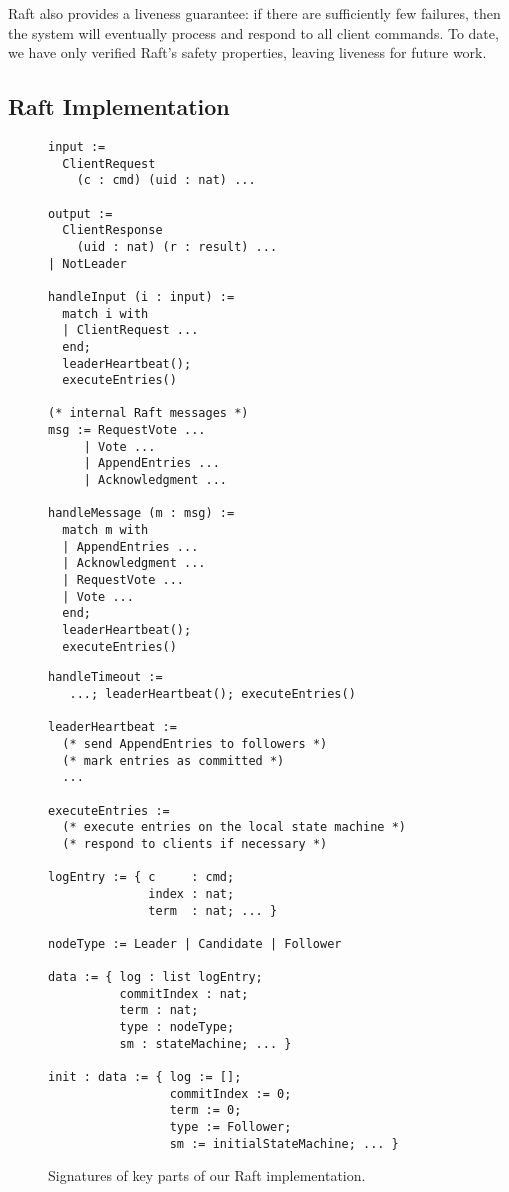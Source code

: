 Raft also provides a liveness guarantee:
if there are sufficiently few failures,
then the system will eventually process and respond to
all client commands.
To date, we have only verified Raft's safety properties,
leaving liveness for future work.

\subsection{Raft Implementation}\label{ssec:verdi:raft-impl}

\begin{figure}[t!]
  \centering
  \small
\begin{minipage}{0.4\linewidth}
\begin{lstlisting}[language=caml,basicstyle=\scriptsize\tt,morekeywords={output,send,nop}]
input :=
  ClientRequest
    (c : cmd) (uid : nat) ...

output :=
  ClientResponse
    (uid : nat) (r : result) ...
| NotLeader

handleInput (i : input) :=
  match i with
  | ClientRequest ...
  end;
  leaderHeartbeat();
  executeEntries()

(* internal Raft messages *)
msg := RequestVote ...
     | Vote ...
     | AppendEntries ...
     | Acknowledgment ...

handleMessage (m : msg) :=
  match m with
  | AppendEntries ...
  | Acknowledgment ...
  | RequestVote ...
  | Vote ...
  end;
  leaderHeartbeat();
  executeEntries()
\end{lstlisting}
\end{minipage}
\begin{minipage}{0.5\linewidth}
\begin{lstlisting}[language=caml,basicstyle=\scriptsize\tt,morekeywords={output,send,nop}]
handleTimeout :=
   ...; leaderHeartbeat(); executeEntries()

leaderHeartbeat :=
  (* send AppendEntries to followers *)
  (* mark entries as committed *)
  ...

executeEntries :=
  (* execute entries on the local state machine *)
  (* respond to clients if necessary *)

logEntry := { c     : cmd;
              index : nat;
              term  : nat; ... }

nodeType := Leader | Candidate | Follower

data := { log : list logEntry;
          commitIndex : nat;
          term : nat;
          type : nodeType;
          sm : stateMachine; ... }

init : data := { log := [];
                 commitIndex := 0;
                 term := 0;
                 type := Follower;
                 sm := initialStateMachine; ... }
\end{lstlisting}
\end{minipage}
  \caption{Signatures of key parts of our Raft implementation.}
\label{fig:raft-pseudocode}
\end{figure}

